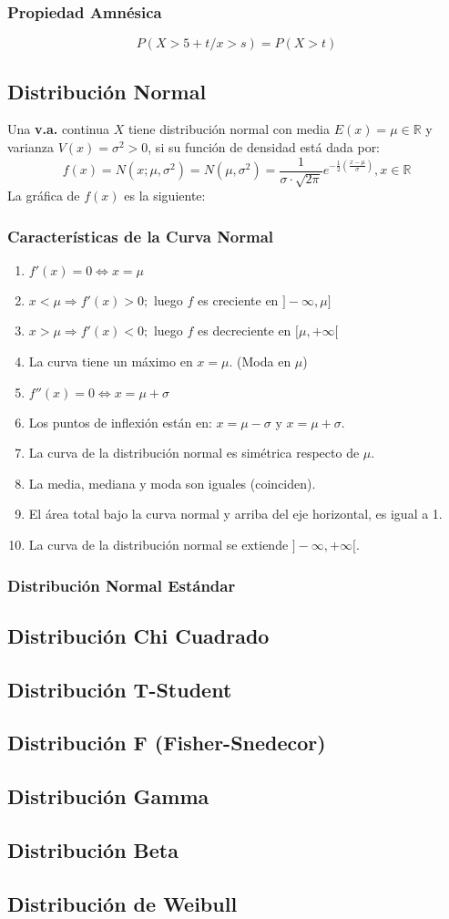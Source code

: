 \subsubsection{Propiedad Amnésica}
$$P(X>5+t / x> s)=P(X>t)$$

\subsection{Distribución Normal}
Una \textbf{v.a.} continua $X$ tiene distribución normal con media $E(x)=\mu \in \mathbb{R}$ y varianza $V(x)=\sigma^2 >0$, si su función de densidad está dada por:
$$
f(x) = N(x;\mu,\sigma^2)=N(\mu,\sigma^2)=\dfrac{1}{\sigma \cdot \sqrt{2\pi}}e^{-\frac{1}{2}(\frac{x-\mu}{\sigma})}, x\in \mathbb{R}
$$
La gráfica de $f(x)$ es la siguiente:
\subsubsection{Características de la Curva Normal}
\begin{enumerate}
\item $f'(x)=0\Leftrightarrow x=\mu$
\item $x<\mu \Rightarrow f'(x)>0;$ luego $f$ es creciente en $]-\infty,\mu]$
\item $x>\mu \Rightarrow f'(x)<0;$ luego $f$ es decreciente en $[\mu,+\infty[$
\item La curva tiene un máximo en $x=\mu$. (Moda en $\mu$)
\item $f''(x)=0 \Leftrightarrow x = \mu + \sigma$
\item Los puntos de inflexión están en: $x=\mu-\sigma$ y $x=\mu+\sigma$.
\item La curva de la distribución normal es simétrica respecto de $\mu$.
\item La media, mediana y moda son iguales (coinciden).
\item El área total bajo la curva normal y arriba del eje horizontal, es igual a 1.
\item La curva de la distribución normal se extiende $]-\infty,+\infty[$.
\end{enumerate}
\subsubsection{Distribución Normal Estándar}
\subsection{Distribución Chi Cuadrado}
\subsection{Distribución T-Student}
\subsection{Distribución F (Fisher-Snedecor)}
\subsection{Distribución Gamma}
\subsection{Distribución Beta}
\subsection{Distribución de Weibull}
